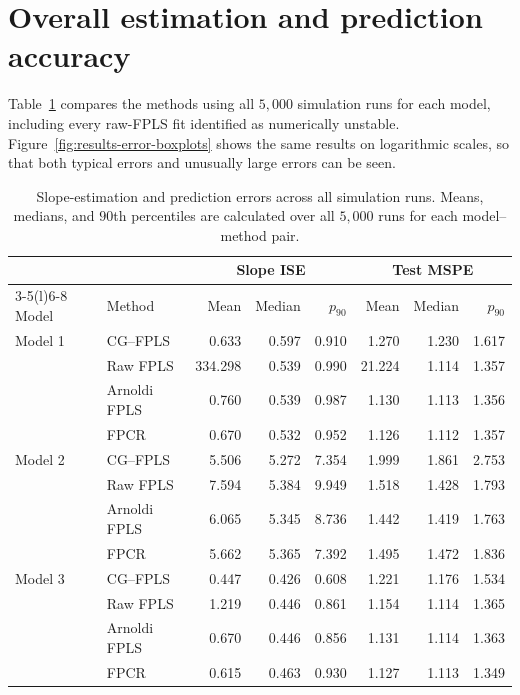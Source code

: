 \section{Overall estimation and prediction accuracy}
\label{sec:results-overall-accuracy}

Table~\ref{tab:results-primary-risk} compares the methods using all $5{,}000$
simulation runs for each model, including every raw-FPLS fit identified as
numerically unstable. Figure~\ref{fig:results-error-boxplots} shows the same
results on logarithmic scales, so that both typical errors and unusually
large errors can be seen.

\begin{table}[htbp]
    \centering
    \small
    \caption[Slope and prediction errors across all simulation runs]{Slope-estimation and prediction errors across all simulation runs. Means,
    medians, and $90$th percentiles are calculated over all $5{,}000$
    runs for each model--method pair.}
    \label{tab:results-primary-risk}
    \begin{tabular}{@{}llrrrrrr@{}}
        \toprule
        & & \multicolumn{3}{c}{Slope ISE}
          & \multicolumn{3}{c}{Test MSPE} \\
        \cmidrule(lr){3-5}\cmidrule(l){6-8}
        Model & Method & Mean & Median & $p_{90}$ & Mean & Median & $p_{90}$ \\
        \midrule
        Model 1 & CG--FPLS       & 0.633 & 0.597 & 0.910 & 1.270 & 1.230 & 1.617 \\
                & Raw FPLS       & 334.298 & 0.539 & 0.990 & 21.224 & 1.114 & 1.357 \\
                & Arnoldi FPLS   & 0.760 & 0.539 & 0.987 & 1.130 & 1.113 & 1.356 \\
                & FPCR           & 0.670 & 0.532 & 0.952 & 1.126 & 1.112 & 1.357 \\
        \addlinespace
        Model 2 & CG--FPLS       & 5.506 & 5.272 & 7.354 & 1.999 & 1.861 & 2.753 \\
                & Raw FPLS       & 7.594 & 5.384 & 9.949 & 1.518 & 1.428 & 1.793 \\
                & Arnoldi FPLS   & 6.065 & 5.345 & 8.736 & 1.442 & 1.419 & 1.763 \\
                & FPCR           & 5.662 & 5.365 & 7.392 & 1.495 & 1.472 & 1.836 \\
        \addlinespace
        Model 3 & CG--FPLS       & 0.447 & 0.426 & 0.608 & 1.221 & 1.176 & 1.534 \\
                & Raw FPLS       & 1.219 & 0.446 & 0.861 & 1.154 & 1.114 & 1.365 \\
                & Arnoldi FPLS   & 0.670 & 0.446 & 0.856 & 1.131 & 1.114 & 1.363 \\
                & FPCR           & 0.615 & 0.463 & 0.930 & 1.127 & 1.113 & 1.349 \\
        \bottomrule
    \end{tabular}
\end{table}

